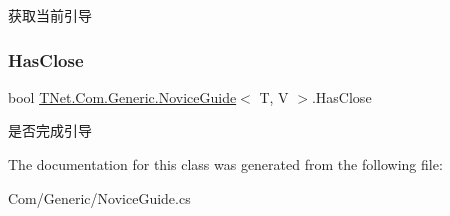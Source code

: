 获取当前引导 

\mbox{\label{class_t_net_1_1_com_1_1_generic_1_1_novice_guide_a6871908367874066d44f6317a2cfdcf1}} 
\subsubsection{\texorpdfstring{Has\+Close}{HasClose}}
{\footnotesize\ttfamily bool \mbox{\hyperlink{class_t_net_1_1_com_1_1_generic_1_1_novice_guide}{T\+Net.\+Com.\+Generic.\+Novice\+Guide}}$<$ T, V $>$.Has\+Close\hspace{0.3cm}{\ttfamily [get]}}



是否完成引导 



The documentation for this class was generated from the following file\+:\begin{DoxyCompactItemize}
\item 
Com/\+Generic/Novice\+Guide.\+cs\end{DoxyCompactItemize}
